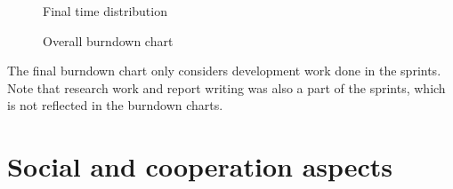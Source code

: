 \begin{center}
  \begin{figure}[ht!]
    \caption{Final time distribution}
    \label{fig:kake2}
  \end{figure}
\end{center}

\begin{center}
  \begin{figure}[ht!]
    \caption{Overall burndown chart}
    \label{fig:release-burndown}
  \end{figure}
\end{center}

The final burndown chart only considers development work done in the sprints. Note that research work and report writing was also a part of the sprints, which is not reflected in the burndown charts.

\section{Social and cooperation aspects}
\label{sec:Social_and_cooperation_aspects}

